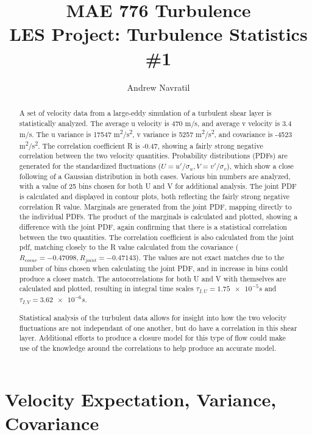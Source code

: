 \documentclass[conf]{new-aiaa}
\title{MAE 776 Turbulence\\LES Project: Turbulence Statistics \#1}
\author{Andrew Navratil}
\begin{document}
\maketitle

\begin{abstract}
	A set of velocity data from a large-eddy simulation of a turbulent shear layer is statistically analyzed.  The average u velocity is 470 m/s, and average v velocity is 3.4 m/s.  The u variance is 17547 m\textsuperscript{2}/s\textsuperscript{2}, v variance is 5257 m\textsuperscript{2}/s\textsuperscript{2}, and covariance is -4523 m\textsuperscript{2}/s\textsuperscript{2}.  The correlation coefficient R is -0.47, showing a fairly strong negative correlation between the two velocity quantities.  Probability distributions (PDFs) are generated for the standardized fluctuations ($U=u'/\sigma_u,V=v'/\sigma_v$), which show a close following of a Gaussian distribution in both cases.  Various bin numbers are analyzed, with a value of 25 bins chosen for both U and V for additional analysis.  The joint PDF is calculated and displayed in contour plots, both reflecting the fairly strong negative correlation R value.  Marginals are generated from the joint PDF, mapping directly to the individual PDFs.  The product of the marginals is calculated and plotted, showing a difference with the joint PDF, again confirming that there is a statistical correlation between the two quantities.  The correlation coefficient is also calculated from the joint pdf, matching closely to the R value calculated from the covariance ($R_{covar} = -0.47098, R_{joint} = -0.47143$).  The values are not exact matches due to the number of bins chosen when calculating the joint PDF, and in increase in bins could produce a closer match.  The autocorrelations for both U and V with themselves are calculated and plotted, resulting in integral time scales $\tau_{I,U} = \num{1.75e-5}s$ and $\tau_{I,V} = \num{3.62e-6}s$.

	Statistical analysis of the turbulent data allows for insight into how the two velocity fluctuations are not independant of one another, but do have a correlation in this shear layer.  Additional efforts to produce a closure model for this type of flow could make use of the knowledge around the correlations to help produce an accurate model.

\end{abstract}

\section{Velocity Expectation, Variance, Covariance}
\bigskip
\end{document}
